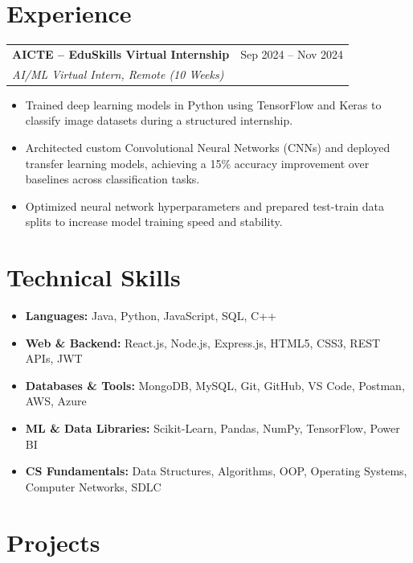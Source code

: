 \documentclass[10pt, a4paper]{article}
\begin{document}
\section*{Experience}
\vspace{1pt}
\begin{tabularx}{\textwidth}{@{}X r@{}}
  \textbf{AICTE – EduSkills Virtual Internship} & Sep 2024 – Nov 2024 \\
  \textit{AI/ML Virtual Intern, Remote (10 Weeks)} & \\
\end{tabularx}
\begin{itemize}
  \item Trained deep learning models in Python using TensorFlow and Keras to classify image datasets during a structured internship.
  \item Architected custom Convolutional Neural Networks (CNNs) and deployed transfer learning models, achieving a 15\% accuracy improvement over baselines across classification tasks.
  \item Optimized neural network hyperparameters and prepared test-train data splits to increase model training speed and stability.
\end{itemize}

\section*{Technical Skills}
\vspace{1pt}
\begin{itemize}
  \item \textbf{Languages:} Java, Python, JavaScript, SQL, C++
  \item \textbf{Web \& Backend:} React.js, Node.js, Express.js, HTML5, CSS3, REST APIs, JWT
  \item \textbf{Databases \& Tools:} MongoDB, MySQL, Git, GitHub, VS Code, Postman, AWS, Azure
  \item \textbf{ML \& Data Libraries:} Scikit-Learn, Pandas, NumPy, TensorFlow, Power BI
  \item \textbf{CS Fundamentals:} Data Structures, Algorithms, OOP, Operating Systems, Computer Networks, SDLC
\end{itemize}

\section*{Projects}
\vspace{1pt}
\end{document}
